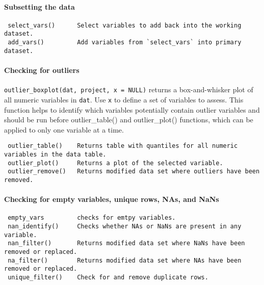 \documentclass[
]{article}
\begin{document}
\hypertarget{subsetting-the-data}{%
\paragraph{Subsetting the data}\label{subsetting-the-data}}

\begin{verbatim}
 select_vars()      Select variables to add back into the working dataset. 
 add_vars()         Add variables from `select_vars` into primary dataset.
\end{verbatim}

\hypertarget{checking-for-outliers}{%
\paragraph{Checking for outliers}\label{checking-for-outliers}}

\texttt{outlier\_boxplot(dat,\ project,\ x\ =\ NULL)} returns a box-and-whisker plot of all numeric variables in \texttt{dat}. Use \texttt{x} to define a set of variables to assess. This function helps to identify which variables potentially contain outlier variables and should be run before outlier\_table() and outlier\_plot() functions, which can be applied to only one variable at a time.

\begin{verbatim}
 outlier_table()    Returns table with quantiles for all numeric variables in the data table.
 outlier_plot()     Returns a plot of the selected variable.
 outlier_remove()   Returns modified data set where outliers have been removed.
\end{verbatim}

\hypertarget{checking-for-empty-variables-unique-rows-nas-and-nans}{%
\paragraph{Checking for empty variables, unique rows, NAs, and NaNs}\label{checking-for-empty-variables-unique-rows-nas-and-nans}}

\begin{verbatim}
 empty_vars         checks for emtpy variables.
 nan_identify()     Checks whether NAs or NaNs are present in any variable.
 nan_filter()       Returns modified data set where NaNs have been removed or replaced.
 na_filter()        Returns modified data set where NAs have been removed or replaced.
 unique_filter()    Check for and remove duplicate rows.
\end{verbatim}
\end{document}
